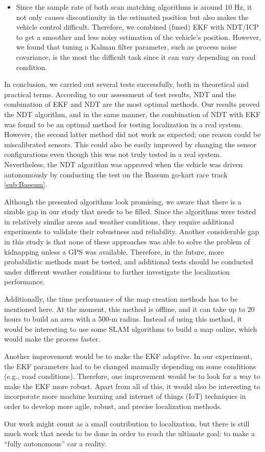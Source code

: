 \newpage
{}
\begin{itemize}
    \item Since the sample rate of both scan matching algorithms is around 10 Hz, it not only causes discontinuity in the estimated position but also makes the vehicle control difficult. Therefore, we combined (fused) EKF with NDT/ICP to get a smoother and less noisy estimation of the vehicle's position. However, we found that tuning a Kalman filter parameter, such as process noise covariance, is the most the difficult task since it can vary depending on road condition.   
\end{itemize}
\par In conclusion, we carried out several tests successfully, both in theoretical and practical terms. According to our assessment of test results, NDT and the combination of EKF and NDT are the most optimal methods. Our results proved the NDT algorithm, and in the same manner, the combination of NDT with EKF was found to be an optimal method for testing localization in a real system. However, the second latter method did not work as expected; one reason could be miscalibrated sensors. This could also be easily improved by changing the sensor configurations even though this was not truly tested in a real system. Nevertheless, the NDT algorithm was approved when the vehicle was driven autonomously by conducting the test on the Bassum go-kart race track  \ref{sub:Bassum}.
\par Although the presented algorithms look promising, we aware that there is a sizable gap in our study that needs to be filled. Since the algorithms were tested in relatively similar areas and weather conditions, they require additional experiments to validate their robustness and reliability. Another considerable gap in this study is that none of these approaches was able to solve the problem of kidnapping unless a GPS was available. Therefore, in the future, more probabilistic methods must be tested, and additional tests should be conducted under different weather conditions to further investigate the localization performance. 
\par Additionally, the time performance of the map creation methods has to be mentioned here. At the moment, this method is offline, and it can take up to 20 hours to build an area with a 500-m radius. Instead of using this method, it would be interesting to use some SLAM algorithms to build a map online, which would make the process faster.
\par Another improvement would be to make the EKF adaptive. In our experiment, the EKF parameters had to be changed manually depending on some conditions (e.g., road conditions). Therefore, one improvement would be to look for a way to make the EKF more robust. Apart from all of this, it would also be interesting to incorporate more machine learning and internet of things (IoT) techniques in order to develop more agile, robust, and precise localization methods.
\par Our work might count as a small contribution to localization, but there is still much work that needs to be done in order to reach the ultimate goal: to make a “fully autonomous” car a reality.